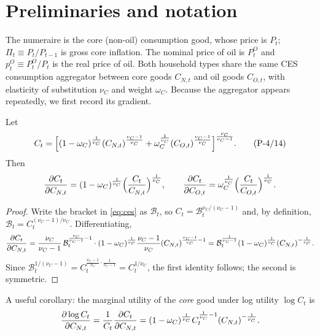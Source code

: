 \section{Preliminaries and notation}

The numeraire is the core (non-oil) consumption good, whose price is $P_t$; $\Pi_t\equiv P_t/P_{t-1}$
is gross core inflation. The nominal price of oil is $P^O_t$ and $p^O_t\equiv P^O_t/P_t$ is the
real price of oil. Both household types share the same CES consumption aggregator between core
goods $C_{N,t}$ and oil goods $C_{O,t}$, with elasticity of substitution $\nu_C$ and weight
$\omega_C$. Because the aggregator appears repeatedly, we first record its gradient.

\begin{lemma}\label{lem:ces}
Let
\begin{equation}\label{eq:ces}
C_t=\Big[(1-\omega_C)^{\frac{1}{\nu_C}}(C_{N,t})^{\frac{\nu_C-1}{\nu_C}}
+\omega_C^{\frac{1}{\nu_C}}(C_{O,t})^{\frac{\nu_C-1}{\nu_C}}\Big]^{\frac{\nu_C}{\nu_C-1}} .
\tag{P-4/14}
\end{equation}
Then
\begin{equation}\label{eq:ces-grad}
\frac{\partial C_t}{\partial C_{N,t}}=(1-\omega_C)^{\frac{1}{\nu_C}}\Big(\frac{C_t}{C_{N,t}}\Big)^{\frac{1}{\nu_C}},
\qquad
\frac{\partial C_t}{\partial C_{O,t}}=\omega_C^{\frac{1}{\nu_C}}\Big(\frac{C_t}{C_{O,t}}\Big)^{\frac{1}{\nu_C}} .
\end{equation}
\end{lemma}

\begin{proof}
Write the bracket in \eqref{eq:ces} as $\mathcal B_t$, so $C_t=\mathcal B_t^{\nu_C/(\nu_C-1)}$ and,
by definition, $\mathcal B_t=C_t^{(\nu_C-1)/\nu_C}$. Differentiating,
\[
\frac{\partial C_t}{\partial C_{N,t}}
=\frac{\nu_C}{\nu_C-1}\,\mathcal B_t^{\frac{\nu_C}{\nu_C-1}-1}\cdot
(1-\omega_C)^{\frac1{\nu_C}}\frac{\nu_C-1}{\nu_C}(C_{N,t})^{\frac{\nu_C-1}{\nu_C}-1}
=\mathcal B_t^{\frac{1}{\nu_C-1}}(1-\omega_C)^{\frac1{\nu_C}}(C_{N,t})^{-\frac1{\nu_C}} .
\]
Since $\mathcal B_t^{1/(\nu_C-1)}=C_t^{\frac{\nu_C-1}{\nu_C}\cdot\frac{1}{\nu_C-1}}=C_t^{1/\nu_C}$,
the first identity follows; the second is symmetric.
\end{proof}

A useful corollary: the marginal utility of the \emph{core} good under log utility $\log C_t$ is
\begin{equation}\label{eq:muc}
\frac{\partial \log C_t}{\partial C_{N,t}}=\frac{1}{C_t}\frac{\partial C_t}{\partial C_{N,t}}
=(1-\omega_C)^{\frac1{\nu_C}}C_t^{\frac1{\nu_C}-1}(C_{N,t})^{-\frac1{\nu_C}} .
\end{equation}

